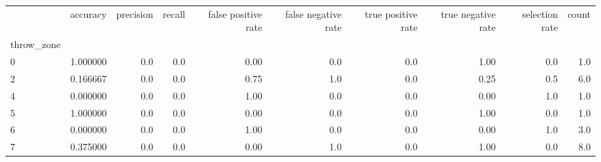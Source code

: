 \begin{tabular}{lrrrrrrrrr}
\toprule
{} &  accuracy &  precision &  recall &  false positive rate &  false negative rate &  true positive rate &  true negative rate &  selection rate &  count \\
throw\_zone &           &            &         &                      &                      &                     &                     &                 &        \\
\midrule
0          &  1.000000 &        0.0 &     0.0 &                 0.00 &                  0.0 &                 0.0 &                1.00 &             0.0 &    1.0 \\
2          &  0.166667 &        0.0 &     0.0 &                 0.75 &                  1.0 &                 0.0 &                0.25 &             0.5 &    6.0 \\
4          &  0.000000 &        0.0 &     0.0 &                 1.00 &                  0.0 &                 0.0 &                0.00 &             1.0 &    1.0 \\
5          &  1.000000 &        0.0 &     0.0 &                 0.00 &                  0.0 &                 0.0 &                1.00 &             0.0 &    1.0 \\
6          &  0.000000 &        0.0 &     0.0 &                 1.00 &                  0.0 &                 0.0 &                0.00 &             1.0 &    3.0 \\
7          &  0.375000 &        0.0 &     0.0 &                 0.00 &                  1.0 &                 0.0 &                1.00 &             0.0 &    8.0 \\
\bottomrule
\end{tabular}
